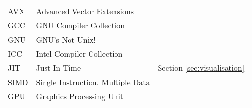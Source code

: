 \begin{abbreviations}
\begin{table}[h]
\begin{tabular}{l|l|l}
    \hline

    AVX & Advanced Vector Extensions & \\
    GCC & GNU Compiler Collection & \\
    GNU & GNU's Not Unix! & \\
    ICC & Intel Compiler Collection & \\
    JIT & Just In Time & Section \ref{sec:visualisation} \\
    SIMD & Single Instruction, Multiple Data & \\
    GPU & Graphics Processing Unit & \\

  \end{tabular} 
  \label{tbl:Abbreviations}
\end{table}



\end{abbreviations}
